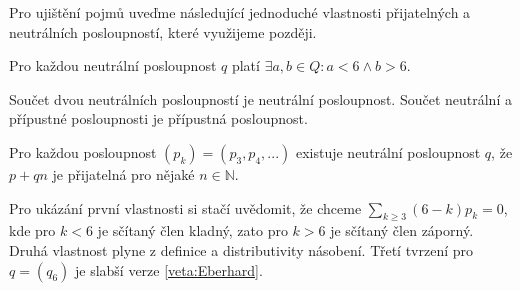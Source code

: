 Pro ujištění pojmů uveďme následující jednoduché vlastnosti přijatelných a neutrálních posloupností, které využijeme později.

\begin{tvrz}\label{veta:posloupnosti}
Pro každou neutrální posloupnost $q$ platí $\exists a,b \in Q : a <6 \wedge b>6$.

Součet dvou neutrálních posloupností je neutrální posloupnost. Součet neutrální a přípustné posloupnosti je přípustná posloupnost.

Pro každou posloupnost $(p_k) = (p_3,p_4,...)$ existuje neutrální posloupnost $q$, že $p+qn$ je přijatelná pro nějaké $n \in \mathbb{N}$.
\end{tvrz}

Pro ukázání první vlastnosti si stačí uvědomit, že chceme $\sum_{k \geq 3}{(6-k)p_k} = 0$, kde pro $k < 6$ je sčítaný člen kladný, zato pro $k>6$ je sčítaný člen záporný. Druhá vlastnost plyne z definice a distributivity násobení. Třetí tvrzení pro $q = (q_6)$ je slabší verze \eqref{veta:Eberhard}.



